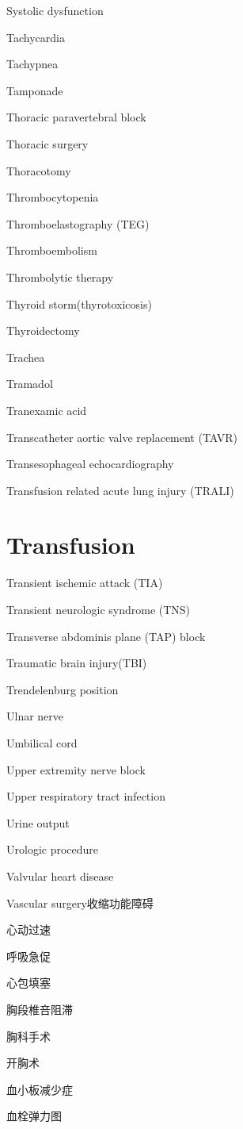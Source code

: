 \documentclass[10pt]{article}
\begin{document}
Systolic dysfunction

Tachycardia

Tachypnea

Tamponade

Thoracic paravertebral block

Thoracic surgery

Thoracotomy

Thrombocytopenia

Thromboelastography (TEG)

Thromboembolism

Thrombolytic therapy

Thyroid storm(thyrotoxicosis)

Thyroidectomy

Trachea

Tramadol

Tranexamic acid

Transcatheter aortic valve replacement (TAVR)

Transesophageal echocardiography

Transfusion related acute lung injury (TRALI)

\section*{Transfusion}
Transient ischemic attack (TIA)

Transient neurologic syndrome (TNS)

Transverse abdominis plane (TAP) block

Traumatic brain injury(TBI)

Trendelenburg position

Ulnar nerve

Umbilical cord

Upper extremity nerve block

Upper respiratory tract infection

Urine output

Urologic procedure

Valvular heart disease

Vascular surgery收缩功能障碍

心动过速

呼吸急促

心包填塞

胸段椎咅阻滞

胸科手术

开胸术

血小板减少症

血栓弹力图
\end{document}
